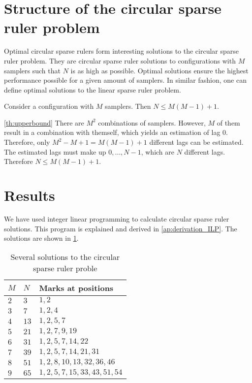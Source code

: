 \documentclass[a4paper, openany, oneside]{memoir}
\begin{document}
\section{Structure of the circular sparse ruler problem}
Optimal circular sparse rulers form interesting solutions to the circular sparse ruler problem. They are circular sparse ruler solutions to configurations with $M$ samplers such that $N$ is as high as possible. Optimal solutions ensure the highest performance possible for a given amount of samplers. In similar fashion, one can define optimal solutions to the linear sparse ruler problem. 

\begin{blockTheorem}\label{th:upperbound}
Consider a configuration with $M$ samplers. Then $N \le M(M-1)+1$.
\end{blockTheorem}

\begin{blockProofTheorem}{\ref{th:upperbound}}
    There are $M^2$ combinations of samplers. However, $M$ of them result in a combination with themself, which yields an estimation of lag $0$. Therefore, only $M^2-M+1=M(M-1)+1$ different lags can be estimated. The estimated lags must make up $0,\ldots,N-1$, which are $N$ different lags. Therefore $N \le M(M-1)+1$.
\end{blockProofTheorem}

\section{Results}
We have used integer linear programming to calculate circular sparse ruler solutions. This program is explained and derived in \cref{ap:derivation_ILP}. The solutions are shown in \cref{tab:circ-sols}.
\begin{table}
    \centering
    \begin{tabular}{lll}
        $M$ & $N$ & \textbf{Marks at positions} \\ \hline
        $2$ & $3$ & $1,2$ \\
        $3$ & $7$ & $1,2,4$ \\
        $4$ & $13$ & $1,2,5,7$ \\
        $5$ & $21$ & $1,2,7,9, 19$ \\
        $6$ & $31$ & $1,2,5,7,14,22$ \\
        $7$ & $39$ & $1,2,5,7,14,21,31$ \\
        $8$ & $51$ & $1,2,8,10,13,32,36, 46$ \\
        $9$ & $65$ & $1,2,5,7,15, 33, 43, 51, 54$ \\
    \end{tabular}
    \caption{Several solutions to the circular sparse ruler proble}
    \label{tab:circ-sols}
\end{table}
\end{document}
